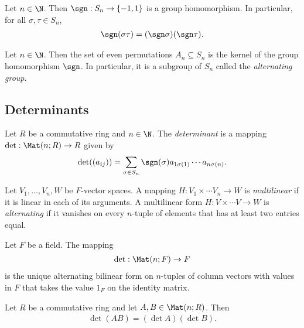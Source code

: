 \documentclass{article}
\begin{document}
\begin{lemma}[Notes 4.1.5]
	Let $n\in\N$. Then $\sgn:S_n\to\{-1,1\}$ is a group homomorphism. In particular, for all $\sigma,\tau\in S_n$,
	\begin{align*}
		\sgn(\sigma\tau) = (\sgn\sigma)(\sgn\tau).
	\end{align*}
\end{lemma}

\begin{definition}
	Let $n\in\N$. Then the set of even permutations $A_n\subseteq S_n$ is the kernel of the
	group homomorphism $\sgn$. In particular, it is a subgroup of $S_n$ called the \emph{alternating
		group}.
\end{definition}

\subsection{Determinants}

\begin{definition}
	Let $R$ be a commutative ring and $n\in\N$. The \emph{determinant} is a mapping
	$\det:\Mat(n;R)\to R$ given by
	\begin{align*}
		\det((a_{ij}))=\sum_{\sigma\in S_n}\sgn(\sigma)a_{1\sigma(1)}\cdots a_{n\sigma(n)}.
	\end{align*}
\end{definition}

\begin{definition}
	Let $V_1,...,V_n,W$ be $F$-vector spaces. A mapping $H:V_1\times\cdots V_n\to W$
	is \emph{multilinear} if it is linear in each of its arguments. A multilinear form
	$H:V\times \cdots V\to W$ is \emph{alternating} if it vanishes on every $n$-tuple of
	elements that has at least two entries equal.
\end{definition}

\begin{theorem}[Notes 4.3.6]
	Let $F$ be a field. The mapping
	\begin{align*}
		\det : \Mat(n; F) \to F
	\end{align*}
	is the unique alternating bilinear form on $n$-tuples of column vectors with values in $F$
	that takes the value $1_F$ on the identity matrix.
\end{theorem}

\begin{theorem}[Notes 4.4.1]
	Let $R$ be a commutative ring and let $A,B\in\Mat(n; R)$. Then
	\begin{align*}
		\det (AB) = (\det A) (\det B).
	\end{align*}
\end{theorem}
\end{document}
